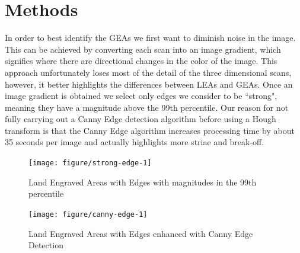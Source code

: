 \documentclass[12pt]{article}\usepackage[]{graphicx}\usepackage[]{color}
\newenvironment{knitrout}{}{} %
\theoremstyle{nonumberplain}
\begin{document}
\section{Methods}


In order to best identify the GEAs we first want to diminish noise in the image. This can be achieved by converting each scan into an image gradient, which signifies where there are directional changes in the color of the image. This approach unfortunately loses most of the detail of the three dimensional scans, however, it better highlights the differences between LEAs and GEAs. Once an image gradient is obtained we select only edges we consider to be ``strong", meaning they have a magnitude above the 99th percentile. Our reason for not fully carrying out a Canny Edge detection algorithm before using a Hough transform is that the Canny Edge algorithm increases processing time by about 35 seconds per image and actually highlights more striae and break-off. 

\begin{knitrout}
\color{fgcolor}\begin{figure}

{\centering \texttt{[image: figure/strong-edge-1]} 

}

\caption[Land Engraved Areas with Edges with magnitudes in the 99th percentile]{Land Engraved Areas with Edges with magnitudes in the 99th percentile}\label{fig:strong-edge}
\end{figure}


\end{knitrout}

\begin{knitrout}
\color{fgcolor}\begin{figure}

{\centering \texttt{[image: figure/canny-edge-1]} 

}

\caption[Land Engraved Areas with Edges enhanced with Canny Edge Detection]{Land Engraved Areas with Edges enhanced with Canny Edge Detection}\label{fig:canny-edge}
\end{figure}


\end{knitrout}
\end{document}
